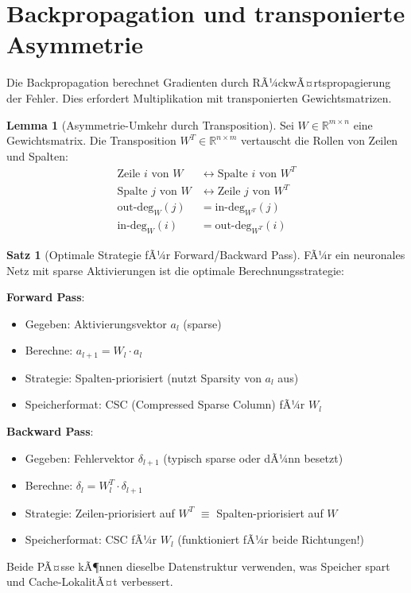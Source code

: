 ﻿\documentclass[a4paper,12pt]{report}
\theoremstyle{definition}
\newtheorem{satz}{Satz}
\newtheorem{lemma}{Lemma}
\begin{document}
	\section{Backpropagation und transponierte Asymmetrie}
	
	Die Backpropagation berechnet Gradienten durch RÃ¼ckwÃ¤rtspropagierung der Fehler. Dies erfordert Multiplikation mit transponierten Gewichtsmatrizen.
	
	\begin{lemma}[Asymmetrie-Umkehr durch Transposition]
		Sei $W \in \mathbb{R}^{m \times n}$ eine Gewichtsmatrix. Die Transposition $W^T \in \mathbb{R}^{n \times m}$ vertauscht die Rollen von Zeilen und Spalten:
		\begin{align}
			\text{Zeile } i \text{ von } W &\leftrightarrow \text{Spalte } i \text{ von } W^T \\
			\text{Spalte } j \text{ von } W &\leftrightarrow \text{Zeile } j \text{ von } W^T \\
			\text{out-deg}_W(j) &= \text{in-deg}_{W^T}(j) \\
			\text{in-deg}_W(i) &= \text{out-deg}_{W^T}(i)
		\end{align}
	\end{lemma}
	
	\begin{satz}[Optimale Strategie fÃ¼r Forward/Backward Pass]
		FÃ¼r ein neuronales Netz mit sparse Aktivierungen ist die optimale Berechnungsstrategie:
		
		\textbf{Forward Pass}: 
		\begin{itemize}
			\item Gegeben: Aktivierungsvektor $a_l$ (sparse)
			\item Berechne: $a_{l+1} = W_l \cdot a_l$
			\item Strategie: Spalten-priorisiert (nutzt Sparsity von $a_l$ aus)
			\item Speicherformat: CSC (Compressed Sparse Column) fÃ¼r $W_l$
		\end{itemize}
		
		\textbf{Backward Pass}:
		\begin{itemize}
			\item Gegeben: Fehlervektor $\delta_{l+1}$ (typisch sparse oder dÃ¼nn besetzt)
			\item Berechne: $\delta_l = W_l^T \cdot \delta_{l+1}$
			\item Strategie: Zeilen-priorisiert auf $W^T$ $\equiv$ Spalten-priorisiert auf $W$
			\item Speicherformat: CSC fÃ¼r $W_l$ (funktioniert fÃ¼r beide Richtungen!)
		\end{itemize}
		
		Beide PÃ¤sse kÃ¶nnen dieselbe Datenstruktur verwenden, was Speicher spart und Cache-LokalitÃ¤t verbessert.
	\end{satz}
	
\end{document}
